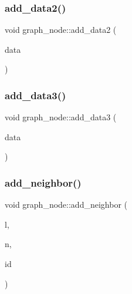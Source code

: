 \mbox{\label{classgraph__node_acfc2c2394a77eff03f4b6d5dbf6bc1c7}} 
\subsubsection{\texorpdfstring{add\+\_\+data2()}{add\_data2()}}
{\footnotesize\ttfamily void graph\+\_\+node\+::add\+\_\+data2 (\begin{DoxyParamCaption}\item[{\mbox{\hyperlink{galois_8h_a09fddde158a3a20bd2dcadb609de11dc}{I\+NT}}}]{data }\end{DoxyParamCaption})}

\mbox{\label{classgraph__node_accb6acbd8e0c485c9e28a30cb902fdc3}} 
\subsubsection{\texorpdfstring{add\+\_\+data3()}{add\_data3()}}
{\footnotesize\ttfamily void graph\+\_\+node\+::add\+\_\+data3 (\begin{DoxyParamCaption}\item[{\mbox{\hyperlink{galois_8h_a09fddde158a3a20bd2dcadb609de11dc}{I\+NT}}}]{data }\end{DoxyParamCaption})}

\mbox{\label{classgraph__node_a22cf1ed1de6059f37be3e8f778cbba09}} 
\subsubsection{\texorpdfstring{add\+\_\+neighbor()}{add\_neighbor()}}
{\footnotesize\ttfamily void graph\+\_\+node\+::add\+\_\+neighbor (\begin{DoxyParamCaption}\item[{\mbox{\hyperlink{galois_8h_a09fddde158a3a20bd2dcadb609de11dc}{I\+NT}}}]{l,  }\item[{\mbox{\hyperlink{galois_8h_a09fddde158a3a20bd2dcadb609de11dc}{I\+NT}}}]{n,  }\item[{\mbox{\hyperlink{galois_8h_a09fddde158a3a20bd2dcadb609de11dc}{I\+NT}}}]{id }\end{DoxyParamCaption})}

